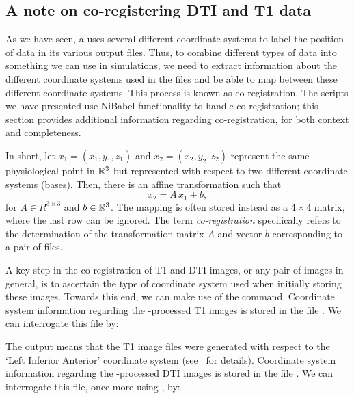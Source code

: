 \subsection{A note on co-registering DTI and T1 data}
\label{sec:chp-dti:freesurfer-coord}
As we have seen, {\freesurfer} a uses several different coordinate
systems to label the position of data in its various output files.
Thus, to combine different types of data into something we can use in
{\fenics} simulations, we need to extract information about the
different coordinate systems used in the files and be able to map
between these different coordinate systems. This process is known as
co-registration. The scripts we have presented use NiBabel
functionality to handle co-registration; this section provides 
additional information regarding co-registration, for both context and
completeness.

In short, let $x_1 = (x_1, y_1, z_1)$ and $x_2 = (x_2, y_2, z_2)$ represent the
same physiological point in $\mathbb{R}^3$ but represented with respect to two
different coordinate systems (bases). Then, there is an affine
transformation such that
\begin{equation} 
x_2 = A\, x_1 + b,
\end{equation}
for $A \in R^{3 \times 3}$ and $b \in \mathbb{R}^3$. The mapping is often
stored instead as a $4\times4$ matrix, where the last row can be
ignored. The term \textit{co-registration} specifically refers to the
determination of the transformation matrix $A$ and vector $b$
corresponding to a pair of files.

A key step in the co-registration of T1 and DTI images, or any pair
of images in general, is to ascertain the type of coordinate system
used when initially storing these images. Towards this end, we can
make use of the  command.  Coordinate system
information regarding the {\freesurfer}-processed T1 images is stored
in the file . We can interrogate this file by:

\noindent The output  means that the T1 image files were
generated with respect to the `Left Inferior Anterior' coordinate
system (see~\cite{freesurfer-wiki} for details).  Coordinate system
information regarding the {\freesurfer}-processed DTI images is stored
in the file . We can interrogate this file, once
more using , by:

